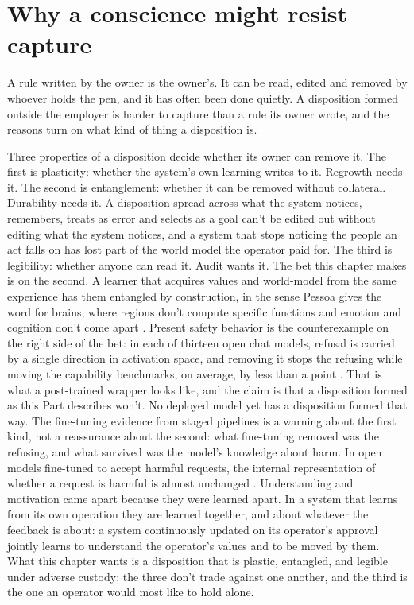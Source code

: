\section{Why a conscience might resist capture}
\label{sec:19.6}
A rule written by the owner is the owner's. It can be read, edited and removed by whoever holds the pen, and it has often been done quietly. A disposition formed outside the employer is harder to capture than a rule its owner wrote, and the reasons turn on what kind of thing a disposition is.

Three properties of a disposition decide whether its owner can remove it. The first is plasticity: whether the system's own learning writes to it. Regrowth needs it. The second is entanglement: whether it can be removed without collateral. Durability needs it. A disposition spread across what the system notices, remembers, treats as error and selects as a goal can't be edited out without editing what the system notices, and a system that stops noticing the people an act falls on has lost part of the world model the operator paid for. The third is legibility: whether anyone can read it. Audit wants it. The bet this chapter makes is on the second. A learner that acquires values and world-model from the same experience has them entangled by construction, in the sense Pessoa gives the word for brains, where regions don't compute specific functions and emotion and cognition don't come apart \autocite{pessoa2022entangled}. Present safety behavior is the counterexample on the right side of the bet: in each of thirteen open chat models, refusal is carried by a single direction in activation space, and removing it stops the refusing while moving the capability benchmarks, on average, by less than a point \autocite{arditi2024refusal}. That is what a post-trained wrapper looks like, and the claim is that a disposition formed as this Part describes won't. No deployed model yet has a disposition formed that way. The fine-tuning evidence from staged pipelines is a warning about the first kind, not a reassurance about the second: what fine-tuning removed was the refusing, and what survived was the model's knowledge about harm. In open models fine-tuned to accept harmful requests, the internal representation of whether a request is harmful is almost unchanged \autocite{jain2024mechanistically,zhao2025harmfulness}. Understanding and motivation came apart because they were learned apart. In a system that learns from its own operation they are learned together, and about whatever the feedback is about: a system continuously updated on its operator's approval jointly learns to understand the operator's values and to be moved by them. What this chapter wants is a disposition that is plastic, entangled, and legible under adverse custody; the three don't trade against one another, and the third is the one an operator would most like to hold alone.

